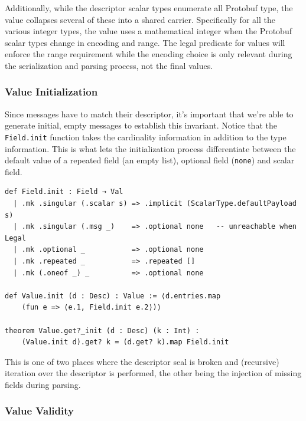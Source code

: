 Additionally, while the descriptor scalar types enumerate all Protobuf type, the
value collapses several of these into a shared carrier. Specifically for all the
various integer types, the value uses a mathematical integer when the Protobuf
scalar types change in encoding and range. The legal predicate for values will
enforce the range requirement while the encoding choice is only relevant
during the serialization and parsing process, not the final values.

\subsubsection{Value Initialization}

Since messages have to match their descriptor, it's important that we're able to
generate initial, empty messages to establish this invariant. Notice that the
\texttt{Field.init} function takes the cardinality information in addition to the
type information. This is what lets the initialization process differentiate
between the default value of a repeated field (an empty list), optional field
(\texttt{none}) and scalar field.

\begin{verbatim}
def Field.init : Field → Val
  | .mk .singular (.scalar s) => .implicit (ScalarType.defaultPayload s)
  | .mk .singular (.msg _)    => .optional none   -- unreachable when Legal
  | .mk .optional _           => .optional none
  | .mk .repeated _           => .repeated []
  | .mk (.oneof _) _          => .optional none

def Value.init (d : Desc) : Value := ⟨d.entries.map
    (fun e => ⟨e.1, Field.init e.2⟩)⟩

theorem Value.get?_init (d : Desc) (k : Int) :
    (Value.init d).get? k = (d.get? k).map Field.init
\end{verbatim}

This is one of two places where the descriptor seal is broken and (recursive) iteration over
the descriptor is performed, the other being the injection of missing fields
during parsing. 

\subsubsection{Value Validity} 

